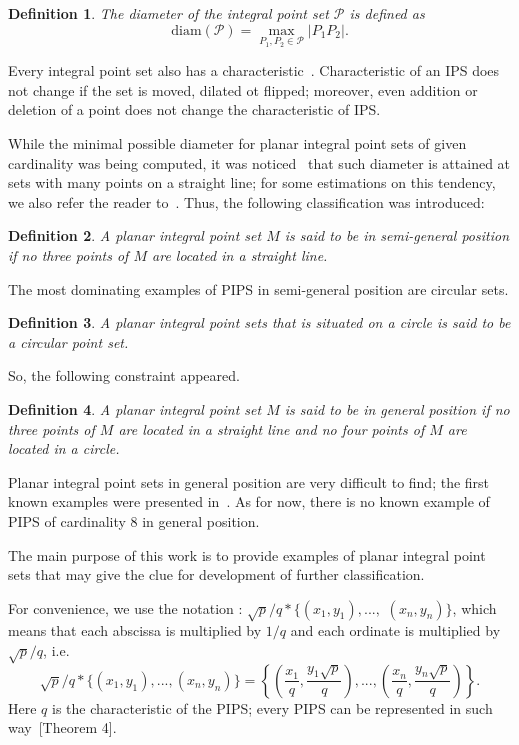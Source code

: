 \documentclass[12pt]{article}
\theoremstyle{theorem}
\theoremstyle{dfn}
\newtheorem{dfn}{Definition}
\theoremstyle{remark}
\begin{document}
\begin{dfn}
	The diameter of the integral point set $\mathcal{P}$ is defined as
	\begin{equation}
		\operatorname{diam(\mathcal{P})} = \underset{P_{1}, P_{2} \in
		\mathcal{P}}{\max} |P_{1}P_{2}|
		.
	\end{equation}
\end{dfn}

Every integral point set also has a characteristic~\cite{kemnitz1988punktmengen,kurz2005characteristic}.
Characteristic of an IPS does not change if the set is moved, dilated ot flipped;
moreover, even addition or deletion of a point does not change the characteristic of IPS.


While the minimal possible diameter for planar integral point sets of given cardinality was being computed,
it was noticed~\cite{kurz2008minimum} that such diameter is attained at sets with many points on a straight line;
for some estimations on this tendency, we also refer the reader to~\cite{solymosi2003note}.
Thus, the following classification was introduced:
\begin{dfn}
	A planar integral point set $M$ is said to be in \emph{semi-general position}
	if no three points of $M$ are located in a straight line.
\end{dfn}

The most dominating examples of PIPS in semi-general position are circular sets.
\begin{dfn}
	A planar integral point sets that is situated on a circle is said to be a \textit{circular}
	point set.
\end{dfn}

So, the following constraint appeared.
\begin{dfn}
	A planar integral point set $M$ is said to be in \emph{general position}
	if no three points of $M$ are located in a straight line
	and no four points of $M$ are located in a circle.
\end{dfn}

Planar integral point sets in general position are very difficult to find;
the first known examples were presented in~\cite{kreisel2008heptagon}.
As for now, there is no known example of PIPS of cardinality 8 in general position.

The main purpose of this work is to provide examples of planar integral point sets
that may give the clue for development of further classification.

For convenience, we use the notation \cite{our-ped-2018,our-pmm-2018,our-vmmsh-2018}:
$\sqrt{p}/q * \{ (x_1,y_1), ...,$ $ (x_n, y_n)  \}$,
which means that each abscissa is multiplied by $1/q$
and each ordinate is multiplied by $\sqrt{p}/q$,  i.e.
\begin{equation}
	\label{eq:char_lattice}
	\sqrt{p}/q * \{ (x_1,y_1), ..., (x_n, y_n)  \}
	=
	\left\{ \left(\frac{x_1}{q},\frac{y_1\sqrt{p}}{q}\right), ..., \left(\frac{x_n}{q},   \frac{y_n\sqrt{p}}{q}\right)  \right\}
	.
\end{equation}
Here $q$ is the characteristic of the PIPS;
every PIPS can be represented in such way~\cite{our-vmmsh-2018-translit}[Theorem 4].
\end{document}
